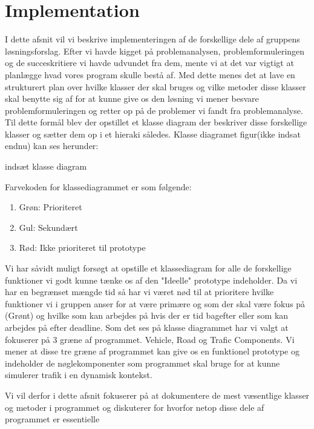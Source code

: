 \chapter{Implementation}\label{Implementation}

I dette afsnit vil vi beskrive implementeringen af de forskellige dele af gruppens løsningsforslag. Efter vi havde kigget på problemanalysen, problemformuleringen og de succeskritiere vi havde udvundet fra dem, mente vi at det var vigtigt at planlægge hvad vores program skulle bestå af. Med dette menes det at lave en strukturert plan over hvilke klasser der skal bruges og vilke metoder disse klasser skal benytte sig af for at kunne give os den løsning vi mener besvare problemformuleringen og retter op på de problemer vi fandt fra problemanalyse. Til dette formål blev der opstillet et klasse diagram der beskriver disse forskellige klasser og sætter dem op i et hieraki således. Klasse diagramet figur(ikke indsat endnu) kan ses herunder:

{indsæt klasse diagram}

Farvekoden for klassediagrammet er som følgende:

\begin{enumerate}
\item Grøn: Prioriteret
\item Gul: Sekundært
\item Rød: Ikke prioriteret til prototype
\end{enumerate}

Vi har såvidt muligt forsøgt at opstille et klassediagram for alle de forskellige funktioner vi godt kunne tænke os af den "Ideelle" prototype indeholder. Da vi har en begrænset mængde tid så har vi været nød til at prioritere hvilke funktioner vi i gruppen anser for at være primære og som der skal være fokus på (Grønt) og hvilke som kan arbejdes på hvis der er tid bagefter eller som kan arbejdes på efter deadline. Som det ses på klasse diagrammet har vi valgt at fokuserer på 3 græne af programmet. Vehicle, Road og Trafic Components. Vi mener at disse tre græne af programmet kan give os en funktionel prototype og indeholder de nøglekomponenter som programmet skal bruge for at kunne simulerer trafik i en dynamisk kontekst.

Vi vil derfor i dette afsnit fokuserer på at dokumentere de mest væsentlige klasser og metoder i programmet og diskuterer for hvorfor netop disse dele af programmet er essentielle

